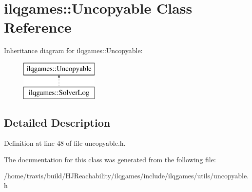 \hypertarget{classilqgames_1_1_uncopyable}{}\section{ilqgames\+:\+:Uncopyable Class Reference}
\label{classilqgames_1_1_uncopyable}
Inheritance diagram for ilqgames\+:\+:Uncopyable\+:\begin{figure}[H]
\begin{center}
\leavevmode
\includegraphics[height=2.000000cm]{classilqgames_1_1_uncopyable}
\end{center}
\end{figure}


\subsection{Detailed Description}


Definition at line 48 of file uncopyable.\+h.



The documentation for this class was generated from the following file\+:\begin{DoxyCompactItemize}
\item 
/home/travis/build/\+H\+J\+Reachability/ilqgames/include/ilqgames/utils/uncopyable.\+h\end{DoxyCompactItemize}

